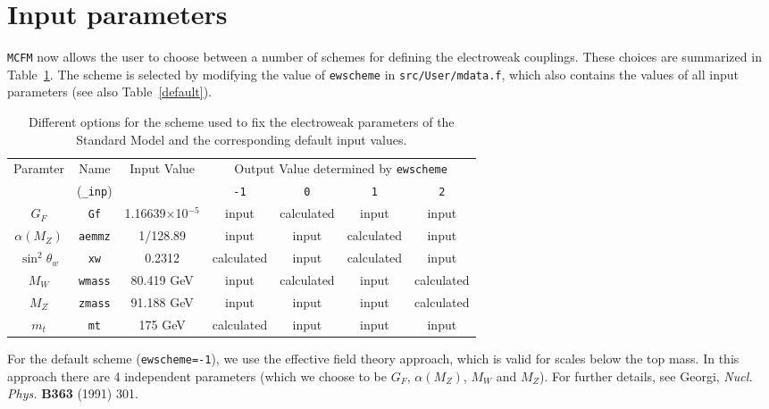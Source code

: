 \documentclass[12pt]{article}
\begin{document}
\section{Input parameters}

{\tt MCFM} now allows the user to choose between a number of schemes
for defining the electroweak couplings. These choices are summarized
in Table~\ref{ewscheme}. The scheme is selected by modifying the
value of {\tt ewscheme} in {\tt src/User/mdata.f}, which also contains
the values of all input parameters (see also Table~\ref{default}).

\begin{table}
\begin{center}
\begin{tabular}{|c|c|c|c|c|c|c|} \hline
 Paramter & Name & Input Value
 & \multicolumn{4}{c|}{Output Value determined by \tt ewscheme} \\
\cline{4-7}
& ({\tt \_inp}) & & {\tt -1} & {\tt 0} & {\tt 1} & {\tt 2} \\ \hline
$G_F$            & {\tt Gf}      & 1.16639$\times$10$^{-5}$ 
 & input & calculated & input & input \\
$\alpha(M_Z)$    & {\tt aemmz}   & 1/128.89                 
 & input & input & calculated & input \\
$\sin^2 \theta_w$& {\tt xw}      & 0.2312               
 & calculated & input & calculated & input \\
$M_W$            & {\tt wmass}   & 80.419 GeV                
 & input & calculated & input & calculated \\
$M_Z$            & {\tt zmass}   & 91.188 GeV               
 & input & input & input & calculated \\
$m_t$            & {\tt mt}      & 175 GeV                  
 & calculated & input & input & input \\
\hline
\end{tabular}
\caption{Different options for the scheme used to fix the electroweak
parameters of the Standard Model and the corresponding default input
values.}
\label{ewscheme}
\end{center}
\end{table}

For the default scheme ({\tt ewscheme=-1}), we use the effective field
theory approach, which is valid for scales below the top mass. In this
approach there are 4 independent parameters (which we choose to be
$G_F$, $\alpha(M_Z)$, $M_W$ and $M_Z$). For further details,
see Georgi, {\it Nucl. Phys.} {\bf B363} (1991) 301. 
\end{document}
